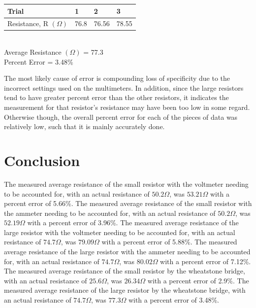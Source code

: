 \documentclass[11pt, titlepage]{article}
\begin{document}
\begin{center}
\begin{tabular}
{|m{9em}|m{7em}|m{7em}|m{7em}|}
\hline
Trial & 1 & 2 & 3 \\
\hline
Resistance, R $(\Omega)$ & 76.8 & 76.56 & 78.55 \\
\hline
\end{tabular}
\\Average Resistance $(\Omega)$ = 77.3
\\Percent Error = 3.48\%
\end{center}

The most likely cause of error is compounding loss of specificity due to the incorrect settings used on the multimeters. In addition, since the large resistors tend to have greater percent error than the other resistors, it indicates the measurement for that resistor's resistance may have been too low in some regard. Otherwise though, the overall percent error for each of the pieces of data was relatively low, such that it is mainly accurately done.

\section*{Conclusion}

The measured average resistance of the small resistor with the voltmeter needing to be accounted for, with an actual resistance of $50.2 \Omega$, was $53.21 \Omega$ with a percent error of 5.66\%. The measured average resistance of the small resistor with the ammeter needing to be accounted for, with an actual resistance of $50.2 \Omega$, was $52.19 \Omega$ with a percent error of 3.96\%. The measured average resistance of the large resistor with the voltmeter needing to be accounted for, with an actual resistance of $74.7 \Omega$, was $79.09 \Omega$ with a percent error of 5.88\%. The measured average resistance of the large resistor with the ammeter needing to be accounted for, with an actual resistance of $74.7 \Omega$, was $80.02 \Omega$ with a percent error of 7.12\%. The measured average resistance of the small resistor by the wheatstone bridge, with an actual resistance of $25.6 \Omega$, was $26.34 \Omega$ with a percent error of 2.9\%. The measured average resistance of the large resistor by the wheatstone bridge, with an actual resistance of $74.7 \Omega$, was $77.3 \Omega$ with a percent error of 3.48\%.
\end{document}
